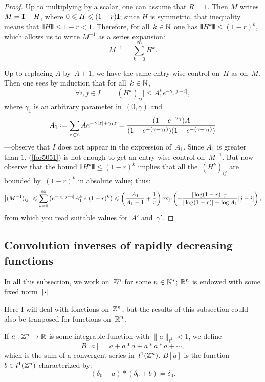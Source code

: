 \begin{proof}
Up to multiplying by a scalar, one can assume that $R=1$.
Then $M$ writes $M = \mathbf{I} - H$, where $0 \leqslant H \leqslant (1-r) \mathbf{I}$;
since $H$ is symmetric, that inequality means that $\VERT H \VERT \leq 1-r < 1$.
Therefore, for all~$k \in \mathbb{N}$ one has $\VERT H^k \VERT \leq (1-r)^k$,
which allows us to write $M^{-1}$ as a series expansion:
\[ M^{-1} = \sum_{k=0}^\infty H^k .\]

Up to replacing $A$ by~$A+1$,
we have the same entry-wise control on~$H$ as on~$M$.
Then one sees by induction that for all~$k\in\mathbb{N}$,
\[\label{for5051}
\forall i,j\in I \qquad \big| (H^k)_{ij} \big| \leq A_1^k e^{-\gamma_1|j-i|} ,\]
where $\gamma_1$ is an arbitrary parameter in~$(0,\gamma)$ and
\[ A_1 \coloneqq \sum_{z\in\ZZ} Ae^{-\gamma|z| + \gamma_1 z}
= \frac{(1-e^{-2\gamma})A}{(1-e^{-(\gamma-\gamma_1)})(1-e^{-(\gamma+\gamma_1)})} \]
—observe that $I$ does not appear in the expression of~$A_1$.
%
Since $A_1$ is greater than $1$,
(\ref{for5051}) is not enough to get an entry-wise control on~$M^{-1}$.
But now observe that the bound $\VERT H^k \VERT \leq (1-r)^k$ implies
that all the~$(H^k)_{ij}$ are bounded by~$(1-r)^k$ in absolute value;
thus:
\[ \big| (M^{-1})_{ij} \big| \leq
\sum_{k=0}^\infty \big( e^{-\gamma_1|j-i|} A_1^k \wedge (1-r)^k \big) \\
\leq \bigg( \frac{A_1}{A_1-1} + \frac{1}{r} \bigg)
\exp \left( -\frac{|\ln(1-r)| \gamma_1}{|\ln(1-r)| + \ln A_1} |j-i| \right) ,
\]
from which you read suitable values for~$A'$ and~$\gamma'$.
\end{proof}


\subsection{Convolution inverses of rapidly decreasing functions}%
\label{parDeconvolutionOfRapidlyDecreasingFunctions}

\begin{NOTA}
In all this subsection, we work on~$\mathbb{Z}^n$ for some $n\in\mathbb{N}^*$;
$\mathbb{R}^n$ is endowed with some fixed norm~$|\Bcdot|$.
\end{NOTA}

\begin{Rmk}
Here I will deal with fonctions on~$\mathbb{Z}^n$, but the results of this subsection
could also be tranposed for functions on~$\mathbb{R}^n$.
\end{Rmk}

\begin{Def}
If $a:\mathbb{Z}^n\to\mathbb{R}$ is some integrable function with
$\|a\|_{\ell^1} < 1$, we define
\[\label{f8928} B[a] = a + a* a + a* a* a + \cdots ,\]
which is the sum of a convergent series in~$l^1(\mathbb{Z}^n)$.
$B[a]$ is the function~$b\in l^1(\mathbb{Z}^n)$ characterized by:
\[ (\delta_0-a) * (\delta_0+b) = \delta_0 .\]
\end{Def}


